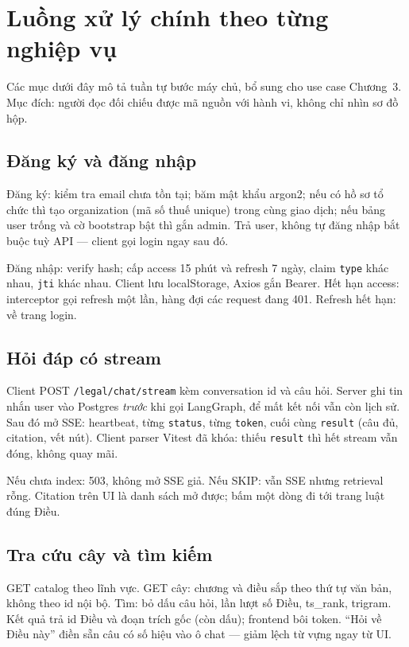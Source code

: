 \section{Luồng xử lý chính theo từng nghiệp vụ}

Các mục dưới đây mô tả tuần tự bước máy chủ, bổ sung cho use case Chương~3.
Mục đích: người đọc đối chiếu được mã nguồn với hành vi, không chỉ nhìn sơ đồ
hộp.

\subsection{Đăng ký và đăng nhập}

Đăng ký: kiểm tra email chưa tồn tại; băm mật khẩu argon2; nếu có hồ sơ tổ chức
thì tạo organization (mã số thuế unique) trong cùng giao dịch; nếu bảng user
trống và cờ bootstrap bật thì gắn admin. Trả user, không tự đăng nhập bắt buộc
tuỳ API --- client gọi login ngay sau đó.

Đăng nhập: verify hash; cấp access 15 phút và refresh 7 ngày, claim
\texttt{type} khác nhau, \texttt{jti} khác nhau. Client lưu localStorage, Axios
gắn Bearer. Hết hạn access: interceptor gọi refresh một lần, hàng đợi các request
đang 401. Refresh hết hạn: về trang login.

\subsection{Hỏi đáp có stream}

Client POST \texttt{/legal/chat/stream} kèm conversation id và câu hỏi. Server
ghi tin nhắn user vào Postgres \emph{trước} khi gọi LangGraph, để mất kết nối
vẫn còn lịch sử. Sau đó mở SSE: heartbeat, từng \texttt{status}, từng
\texttt{token}, cuối cùng \texttt{result} (câu đủ, citation, vết nút). Client
parser Vitest đã khóa: thiếu \texttt{result} thì hết stream vẫn đóng, không quay
mãi.

Nếu chưa index: 503, không mở SSE giả. Nếu SKIP: vẫn SSE nhưng retrieval rỗng.
Citation trên UI là danh sách mở được; bấm một dòng đi tới trang luật đúng Điều.

\subsection{Tra cứu cây và tìm kiếm}

GET catalog theo lĩnh vực. GET cây: chương và điều sắp theo thứ tự văn bản, không
theo id nội bộ. Tìm: bỏ dấu câu hỏi, lần lượt số Điều, ts\_rank, trigram. Kết quả
trả id Điều và đoạn trích gốc (còn dấu); frontend bôi token. ``Hỏi về Điều này''
điền sẵn câu có số hiệu vào ô chat --- giảm lệch từ vựng ngay từ UI.


